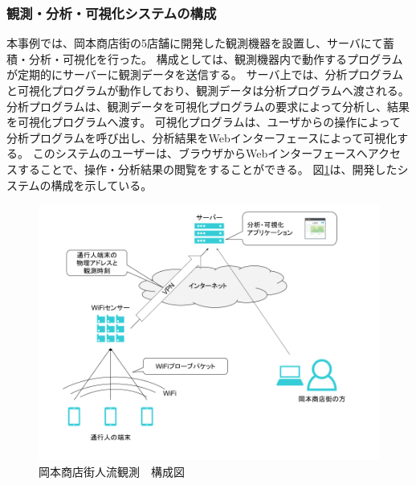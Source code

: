 \subsubsection{観測・分析・可視化システムの構成}
本事例では、岡本商店街の5店舗に開発した観測機器を設置し、サーバにて蓄積・分析・可視化を行った。
構成としては、観測機器内で動作するプログラムが定期的にサーバーに観測データを送信する。
サーバ上では、分析プログラムと可視化プログラムが動作しており、観測データは分析プログラムへ渡される。
分析プログラムは、観測データを可視化プログラムの要求によって分析し、結果を可視化プログラムへ渡す。
可視化プログラムは、ユーザからの操作によって分析プログラムを呼び出し、分析結果をWebインターフェースによって可視化する。
このシステムのユーザーは、ブラウザからWebインターフェースへアクセスすることで、操作・分析結果の閲覧をすることができる。
図\ref{fig:okamoto_diag1}は、開発したシステムの構成を示している。
\begin{figure}[htbp]
\includegraphics[width=16cm]{images/okamoto_diag1.png}
\caption{岡本商店街人流観測　構成図}
\label{fig:okamoto_diag1}
\end{figure}

